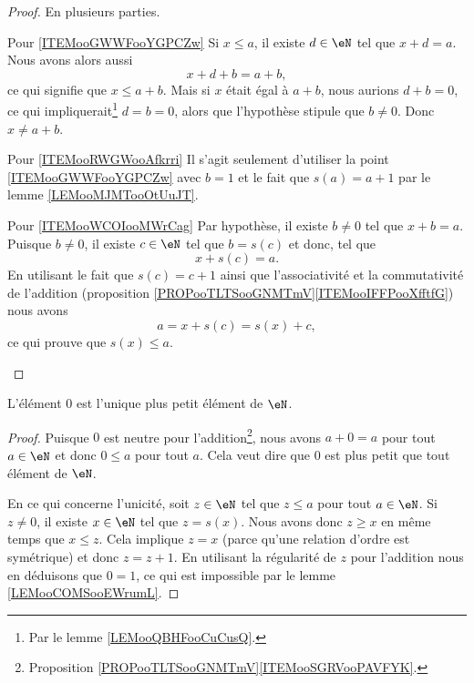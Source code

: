 \begin{proof}
    En plusieurs parties.
    \begin{subproof}
    \item[Pour \ref{ITEMooGWWFooYGPCZw}]
        Si \( x\leq a\), il existe \( d\in \eN\) tel que \( x+d=a\). Nous avons alors aussi
        \begin{equation}
            x+d+b=a+b,
        \end{equation}
        ce qui signifie que \( x\leq a+b\). Mais si \( x\) était égal à \( a+b\), nous aurions \( d+b=0\), ce qui impliquerait\footnote{Par le lemme \ref{LEMooQBHFooCuCusQ}.} \( d=b=0\), alors que l'hypothèse stipule que \( b\neq 0\). Donc \( x\neq a+b\).
    \item[Pour \ref{ITEMooRWGWooAfkrri}]
        Il s'agit seulement d'utiliser la point \ref{ITEMooGWWFooYGPCZw} avec \( b=1\) et le fait que \( s(a)=a+1\) par le lemme \ref{LEMooMJMTooOtUuJT}.
    \item[Pour \ref{ITEMooWCOIooMWrCag}]
        Par hypothèse, il existe \( b\neq 0\) tel que \( x+b=a\). Puisque \( b\neq 0\), il existe \( c\in \eN\) tel que \( b=s(c)\) et donc, tel que
        \begin{equation}
            x+s(c)=a.
        \end{equation}
        En utilisant le fait que \( s(c)=c+1\) ainsi que l'associativité et la commutativité de l'addition (proposition \ref{PROPooTLTSooGNMTmV}\ref{ITEMooIFFPooXfftfG}) nous avons
        \begin{equation}
            a=x+s(c)=s(x)+c,
        \end{equation}
        ce qui prouve que \( s(x)\leq a\).
    \end{subproof}
\end{proof}

\begin{lemma}       \label{LEMooCSIXooHeuWEd}
    L'élément \( 0\) est l'unique plus petit élément de \( \eN\).
\end{lemma}

\begin{proof}
        Puisque \( 0\) est neutre pour l'addition\footnote{Proposition \ref{PROPooTLTSooGNMTmV}\ref{ITEMooSGRVooPAVFYK}.}, nous avons \( a+0=a\) pour tout \( a\in \eN\) et donc \( 0\leq a\) pour tout \( a\). Cela veut dire que \( 0\) est plus petit que tout élément de \( \eN\).

        En ce qui concerne l'unicité, soit \( z\in \eN\) tel que \( z\leq a\) pour tout \( a\in \eN\). Si \( z\neq 0\), il existe \( x\in \eN\) tel que \( z=s(x)\). Nous avons donc \( z\geq x\) en même temps que \(x\leq z\). Cela implique \( z=x\) (parce qu'une relation d'ordre est symétrique) et donc \( z=z+1\). En utilisant la régularité de \( z\) pour l'addition nous en déduisons que \( 0=1\), ce qui est impossible par le lemme \ref{LEMooCOMSooEWrumL}.
\end{proof}

